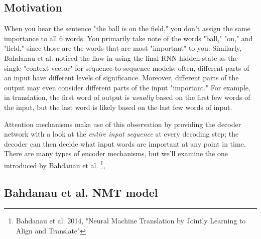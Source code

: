 \documentclass{tufte-handout}
\begin{document}
\subsection{Motivation}

When you hear the sentence "the ball is on the field," you don't assign the same importance to all 6 words. You primarily take note of the words "ball," "on," and "field," since those are the words that are most "important" to you. Similarly, Bahdanau et al. noticed the flaw in using the final RNN hidden state as the single "context vector" for sequence-to-sequence models: often, different parts of an input have different levels of significance. Moreover, different parts of the output may even consider different parts of the input "important." For example, in translation, the first word of output is \textit{usually} based on the first few words of the input, but the last word is likely based on the last few words of input.

Attention mechanisms make use of this observation by providing the decoder network with a look at the \textit{entire input sequence} at every decoding step; the decoder can then decide what input words are important at any point in time. There are many types of encoder mechanisms, but we'll examine the one introduced by Bahdanau et al.  \footnote{Bahdanau et al. 2014, "Neural Machine Translation by Jointly Learning to Align and Translate"},




\subsection{Bahdanau et al. NMT model}
\end{document}
